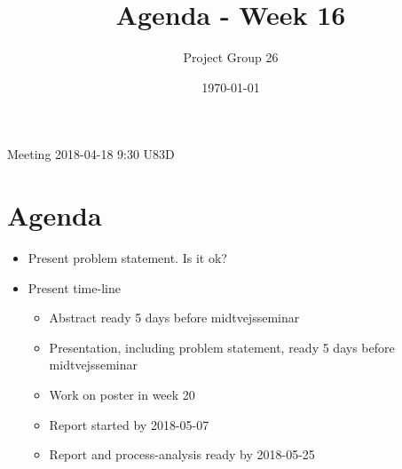 \documentclass{article}
\title{Agenda - Week 16}
\author{Project Group 26}
\date{\today}
\begin{document}
\maketitle

Meeting 2018-04-18 9:30 U83D

\section{Agenda}

\begin{itemize}
    \item Present problem statement. Is it ok?
    \item Present time-line
    \begin{itemize}
        \item Abstract ready 5 days before midtvejsseminar
        \item Presentation, including problem statement, ready 5 days before                 midtvejsseminar
        \item Work on poster in week 20
        \item Report started by 2018-05-07
        \item Report and process-analysis ready by 2018-05-25
    \end{itemize}
    
\end{itemize}
\end{document}
